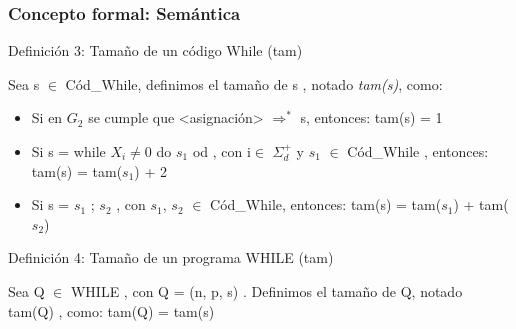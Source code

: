 \documentclass[xcolor=table]{beamer}
\begin{document}
\begin{frame}[fragile]\frametitle{Concepto formal: Semántica} \small  

\begin{block}{Definición 3: Tamaño de un código While (tam)}
\end{block}
Sea s $\in$ Cód\_While, definimos el tamaño de s , notado \textit{tam(s)}, como:


\begin{itemize}
    \item Si en $G_2$ se cumple que <asignación> $\Rightarrow^*$ s, entonces: tam(s) = 1

    \item Si s = while $X_i \neq 0$ do $s_1$ od , con i$\in$ $\Sigma_d^+$
y $s_1$ $\in$ Cód\_While , entonces: tam(s) = tam($s_1$) + 2

    \item Si s = $s_1$ ; $s_2$ , con $s_1$, $s_2$ $\in$ Cód\_While, entonces: tam(s) = tam($s_1$) + tam($s_2$)
\end{itemize}



\begin{block}{Definición 4: Tamaño de un programa WHILE (tam)}
\end{block}

Sea Q $\in$ WHILE , con Q = (n, p, s) . Definimos el tamaño de Q, notado tam(Q) , como: tam(Q) = tam(s)

\end{frame}
\end{document}
